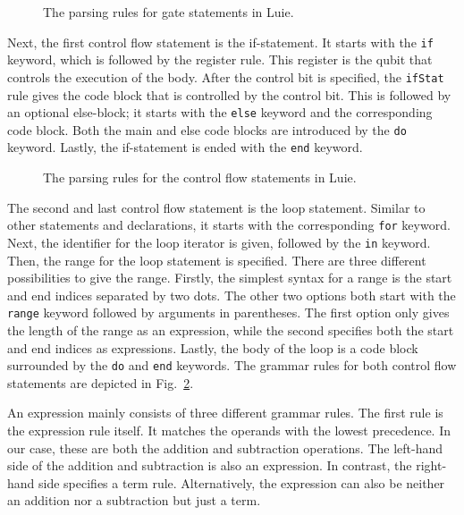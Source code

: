 \begin{figure}[]
    \centering
    
    \caption{The parsing rules for gate statements in Luie.}
    \label{fig:implementation_grammarGateStatements}
\end{figure}

Next, the first control flow statement is the if-statement. It starts with the \texttt{if} keyword, which is followed by the register rule. This register is the qubit that controls the execution of the body. After the control bit is specified, the \texttt{ifStat} rule gives the code block that is controlled by the control bit. This is followed by an optional else-block; it starts with the \texttt{else} keyword and the corresponding code block. Both the main and else code blocks are introduced by the \texttt{do} keyword. Lastly, the if-statement is ended with the \texttt{end} keyword.

\begin{figure}[b]
    \centering
    
    \caption{The parsing rules for the control flow statements in Luie.}
    \label{fig:implementation_controlFlowStatements}
\end{figure}

The second and last control flow statement is the loop statement. Similar to other statements and declarations, it starts with the corresponding \texttt{for} keyword. Next, the identifier for the loop iterator is given, followed by the \texttt{in} keyword. Then, the range for the loop statement is specified. There are three different possibilities to give the range. Firstly, the simplest syntax for a range is the start and end indices separated by two dots. The other two options both start with the \texttt{range} keyword followed by arguments in parentheses. The first option only gives the length of the range as an expression, while the second specifies both the start and end indices as expressions. Lastly, the body of the loop is a code block surrounded by the \texttt{do} and \texttt{end} keywords.
The grammar rules for both control flow statements are depicted in Fig.~\ref{fig:implementation_controlFlowStatements}.

An expression mainly consists of three different grammar rules. The first rule is the expression rule itself. It matches the operands with the lowest precedence. In our case, these are both the addition and subtraction operations. The left-hand side of the addition and subtraction is also an expression. In contrast, the right-hand side specifies a term rule. Alternatively, the expression can also be neither an addition nor a subtraction but just a term.

